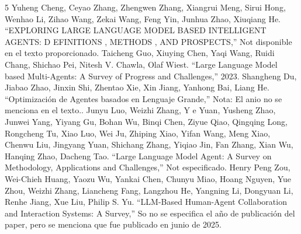 \begin{thebibliography}{5}
 Yuheng Cheng, Ceyao Zhang, Zhengwen Zhang, Xiangrui Meng, Sirui Hong, Wenhao Li, Zihao Wang, Zekai Wang, Feng Yin, Junhua Zhao, Xiuqiang He. ``EXPLORING LARGE LANGUAGE MODEL BASED INTELLIGENT AGENTS: D EFINITIONS , METHODS , AND PROSPECTS,'' Not disponible en el texto proporcionado.
 Taicheng Guo, Xiuying Chen, Yaqi Wang, Ruidi Chang, Shichao Pei, Nitesh V. Chawla, Olaf Wiest. ``Large Language Model based Multi-Agents: A Survey of Progress and Challenges,'' 2023.
 Shangheng Du, Jiabao Zhao, Jinxin Shi, Zhentao Xie, Xin Jiang, Yanhong Bai, Liang He. ``Optimización de Agentes basados en Lenguaje Grande,'' Nota: El anio no se menciona en el texto..
 Junyu Luo, Weizhi Zhang, Y e Yuan, Yusheng Zhao, Junwei Yang, Yiyang Gu, Bohan Wu, Binqi Chen, Ziyue Qiao, Qingqing Long, Rongcheng Tu, Xiao Luo, Wei Ju, Zhiping Xiao, Yifan Wang, Meng Xiao, Chenwu Liu, Jingyang Yuan, Shichang Zhang, Yiqiao Jin, Fan Zhang, Xian Wu, Hanqing Zhao, Dacheng Tao. ``Large Language Model Agent: A Survey on Methodology, Applications and Challenges,'' Not especificado.
 Henry Peng Zou, Wei-Chieh Huang, Yaozu Wu, Yankai Chen, Chunyu Miao, Hoang Nguyen, Yue Zhou, Weizhi Zhang, Liancheng Fang, Langzhou He, Yangning Li, Dongyuan Li, Renhe Jiang, Xue Liu, Philip S. Yu. ``LLM-Based Human-Agent Collaboration and Interaction Systems: A Survey,'' So no se especifica el año de publicación del paper, pero se menciona que fue publicado en junio de 2025.
\end{thebibliography}